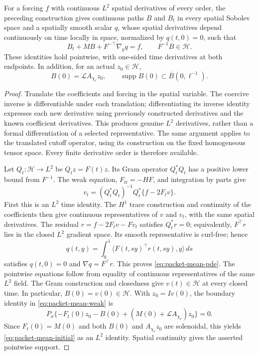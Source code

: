 \begin{lemma}\label{lem:packet-strong-mean}
For a forcing $f$ with continuous $L^2$ spatial derivatives of every
order, the preceding construction gives continuous paths $B$ and $B_t$
in every spatial Sobolev space and a spatially smooth scalar $q$,
whose spatial derivatives depend continuously on time locally in space,
normalized by $q(t,0)=0$, such that
\begin{equation}\label{eq:packet-mean-pde}
 B_t+MB+F^{-\top}\nabla_yq=f,
 \qquad F^{-1}B\in\mathcal H.
\end{equation}
These identities hold pointwise, with one-sided time derivatives at both
endpoints. In addition, for an actual $z_0\in\mathcal H$,
\begin{equation}\label{eq:packet-mean-initial}
 B(0)=\mathcal L A_{\chi_\ell}z_0,
 \qquad\operatorname{supp}B(0)\subset\overline B(0,\ell^{-1}).
\end{equation}
\end{lemma}
\begin{proof}
Translate the coefficients and forcing in the spatial variable. The
coercive inverse is differentiable under each translation; differentiating
its inverse identity expresses each new derivative using previously
constructed derivatives and the known coefficient derivatives. This
produces genuine $L^2$ derivatives, rather than a formal differentiation
of a selected representative. The same argument applies to the translated
cutoff operator, using its construction on the fixed homogeneous tensor
space. Every finite derivative order is therefore available.

Let $Q_t:\mathcal H\to L^2$ be $Q_tz=F(t)z$. Its Gram operator
$Q_t^*Q_t$ has a positive lower bound from $F^{-1}$. The weak equation,
$F_{tt}=-HF$, and integration by parts give
\[
 v_t=(Q_t^*Q_t)^{-1}Q_t^*\{f-2F_tv\}.
\]
First this is an $L^2$ time identity. The $H^1$ trace construction and
continuity of the coefficients then give continuous representatives of
$v$ and $v_t$, with the same spatial derivatives. The residual
$r=f-2F_tv-Fv_t$ satisfies $Q_t^*r=0$; equivalently,
$F^{\top}r$ lies in the closed $L^2$ gradient space. Its smooth
representative is curl-free; hence
\[
 q(t,y)=\int_0^1\langle F(t,sy)^{\top}r(t,sy),y\rangle\,ds
\]
satisfies $q(t,0)=0$ and $\nabla q=F^{\top}r$. This proves
\eqref{eq:packet-mean-pde}. The pointwise equations follow from equality
of continuous representatives of the same $L^2$ field. The Gram
construction and closedness give $v(t)\in\mathcal H$ at every closed
time. In particular, $B(0)=v(0)\in\mathcal H$. With $z_0=Iv(0)$,
the boundary identity in \eqref{eq:packet-mean-weak} is
\[
 P_\sigma\{-F_t(0)z_0-B(0)+(M(0)+\mathcal L A_{\chi_\ell})z_0\}=0.
\]
Since $F_t(0)=M(0)$ and both $B(0)$ and $A_{\chi_\ell}z_0$ are
solenoidal, this yields \eqref{eq:packet-mean-initial} as an $L^2$
identity. Spatial continuity gives the asserted pointwise support.
\end{proof}

